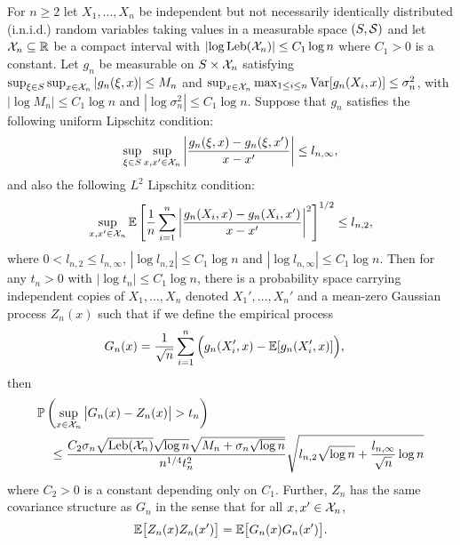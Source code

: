 \begin{lemma}
  \label{lem:yurinskii_corollary}

  For $n \geq 2$ let $X_1, \dots, X_n$
  be independent but not necessarily identically distributed
  (i.n.i.d.) random variables
  taking values in a measurable space $(S, \mathcal{S})$
  and let $\mathcal{X}_n \subseteq \mathbb{R}$
  be a compact interval
  with $\left|\log \operatorname{Leb}(\mathcal{X}_n)\right| \leq C_1 \log n$
  where $C_1 > 0$ is a constant.
  Let $g_n$ be measurable on $S \times \mathcal{X}_n$ satisfying
  $\sup_{\xi \in S} \sup_{x \in \mathcal{X}_n} |g_n(\xi, x)| \leq M_n$
  and
  $\sup_{x \in \mathcal{X}_n} \max_{1 \leq i \leq n} \operatorname{Var}[g_n(X_i, x)]
  \leq \sigma_n^2$,
  with $\left|\log M_n\right| \leq C_1 \log n$
  and $\left|\log \sigma_n^2\right| \leq C_1 \log n$.
  Suppose that $g_n$ satisfies the following uniform
  Lipschitz condition:
  \begin{align*}
    \sup_{\xi \in S}
    \sup_{x,x' \in \mathcal{X}_n}
    \left|
    \frac{g_n(\xi, x) - g_n(\xi, x')}
    {x-x'}
    \right|
    \leq
    l_{n,\infty},
  \end{align*}
  and also the following $L^2$
  Lipschitz condition:
  \begin{align*}
    \sup_{x,x' \in \mathcal{X}_n}
    \mathbb{E}\left[
      \frac{1}{n}
      \sum_{i=1}^n
      \left|
      \frac{g_n(X_i, x) - g_n(X_i, x')}
      {x-x'}
      \right|^2
    \right]^{1/2}
    \leq
    l_{n,2},
  \end{align*}
  where $0 < l_{n,2} \leq l_{n,\infty}$,
  $\left|\log l_{n,2}\right| \leq C_1 \log n$ and
  $\left|\log l_{n,\infty}\right| \leq C_1 \log n$.
  Then for any $t_n > 0$ with
  $\left|\log t_n\right| \leq C_1 \log n$,
  there is a probability space carrying
  independent copies of
  $X_1, \ldots, X_n$
  denoted
  $X_1', \ldots, X_n'$
  and a mean-zero Gaussian process $Z_n(x)$
  such that if we define the empirical process
  \begin{align*}
    G_n(x)
    &=
    \frac{1}{\sqrt n}
    \sum_{i=1}^n
    \Big(
      g_n(X'_i,x)
      - \mathbb{E}[g_n(X'_i,x)]
    \Big),
  \end{align*}
  then
  \begin{align*}
    &\mathbb{P}\left(
      \sup_{x \in \mathcal{X}_n}
      \big|
      G_n(x) - Z_n(x)
      \big|
      > t_n
    \right) \\
    &\quad\leq
    \frac{
      C_2
      \sigma_n
      \sqrt{\operatorname{Leb}(\mathcal{X}_n)}
      \sqrt{\log n}
      \sqrt{M_n + \sigma_n\sqrt{\log n}}
    }{n^{1/4} t_n^2}
    \sqrt{
      l_{n,2}
      \sqrt{\log n}
      + \frac{l_{n,\infty}}{\sqrt n}
    \log n}
  \end{align*}
  where $C_2 > 0$ is a constant depending only on $C_1$.
  Further, $Z_n$
  has the same covariance structure as $G_n$
  in the sense that for all $x, x' \in \mathcal{X}_n$,
  \begin{align*}
    \mathbb{E}\big[Z_n(x) Z_n(x')\big]
    = \mathbb{E}\big[G_n(x) G_n(x')\big].
  \end{align*}

\end{lemma}

